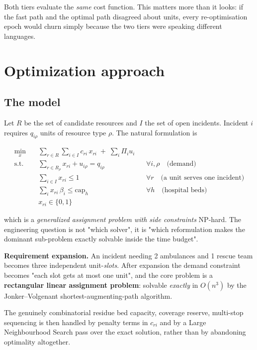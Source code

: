 Both tiers evaluate the \emph{same} cost function. This matters more than it
looks: if the fast path and the optimal path disagreed about units, every
re-optimisation epoch would churn simply because the two tiers were
speaking different languages.

\section{Optimization approach}

\subsection{The model}

Let $R$ be the set of candidate resources and $I$ the set of open incidents.
Incident $i$ requires $q_{i\rho}$ units of resource type $\rho$. The natural
formulation is

\begin{align*}
\min_{x} \quad & \sum_{r\in R}\sum_{i\in I} c_{ri}\,x_{ri} \;+\; \sum_{i} \Pi_i u_i \\
\text{s.t.}\quad
& \textstyle\sum_{r\in R_\rho} x_{ri} + u_{i\rho} = q_{i\rho} && \forall i,\rho \quad\text{(demand)}\\
& \textstyle\sum_{i\in I} x_{ri} \le 1 && \forall r \quad\text{(a unit serves one incident)}\\
& \textstyle\sum_{i} x_{ri}\,\beta_i \le \text{cap}_h && \forall h \quad\text{(hospital beds)}\\
& x_{ri}\in\{0,1\}
\end{align*}

\noindent which is a \emph{generalized assignment problem with side
constraints} \textemdash{} NP-hard. The engineering question is not "which
solver", it is "which reformulation makes the dominant sub-problem exactly
solvable inside the time budget".

\begin{keybox}
\textbf{Requirement expansion.} An incident needing 2 ambulances and 1 rescue
team becomes three independent unit-\emph{slots}. After expansion the demand
constraint becomes "each slot gets at most one unit", and the core problem is
a \textbf{rectangular linear assignment problem}: solvable \emph{exactly} in
$O(n^3)$ by the Jonker--Volgenant shortest-augmenting-path algorithm.

The genuinely combinatorial residue \textemdash{} bed capacity, coverage
reserve, multi-stop sequencing \textemdash{} is then handled by penalty terms
in $c_{ri}$ and by a Large Neighbourhood Search pass over the exact solution,
rather than by abandoning optimality altogether.
\end{keybox}

